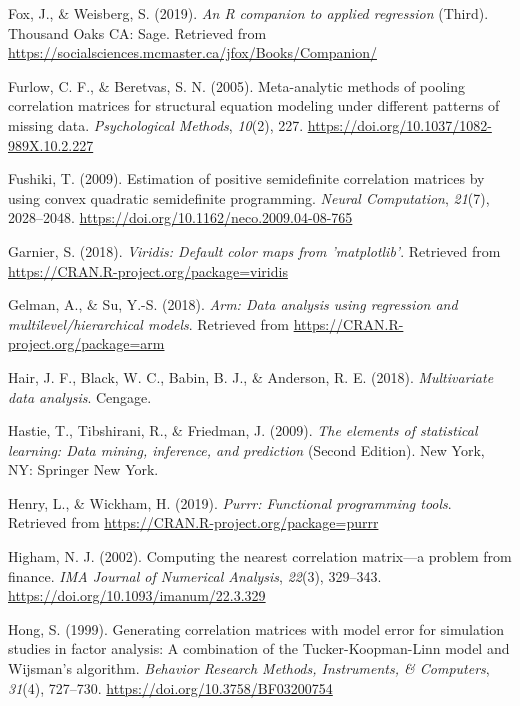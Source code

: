\documentclass[
  english,
  man]{apa6}
\begin{document}
\leavevmode\hypertarget{ref-R-car}{}%
Fox, J., \& Weisberg, S. (2019). \emph{An R companion to applied regression} (Third). Thousand Oaks CA: Sage. Retrieved from \url{https://socialsciences.mcmaster.ca/jfox/Books/Companion/}

\leavevmode\hypertarget{ref-furlow2005}{}%
Furlow, C. F., \& Beretvas, S. N. (2005). Meta-analytic methods of pooling correlation matrices for structural equation modeling under different patterns of missing data. \emph{Psychological Methods}, \emph{10}(2), 227. \url{https://doi.org/10.1037/1082-989X.10.2.227}

\leavevmode\hypertarget{ref-fushiki2009}{}%
Fushiki, T. (2009). Estimation of positive semidefinite correlation matrices by using convex quadratic semidefinite programming. \emph{Neural Computation}, \emph{21}(7), 2028--2048. \url{https://doi.org/10.1162/neco.2009.04-08-765}

\leavevmode\hypertarget{ref-R-viridis}{}%
Garnier, S. (2018). \emph{Viridis: Default color maps from 'matplotlib'}. Retrieved from \url{https://CRAN.R-project.org/package=viridis}

\leavevmode\hypertarget{ref-R-arm}{}%
Gelman, A., \& Su, Y.-S. (2018). \emph{Arm: Data analysis using regression and multilevel/hierarchical models}. Retrieved from \url{https://CRAN.R-project.org/package=arm}

\leavevmode\hypertarget{ref-hair2018}{}%
Hair, J. F., Black, W. C., Babin, B. J., \& Anderson, R. E. (2018). \emph{Multivariate data analysis}. Cengage.

\leavevmode\hypertarget{ref-hastie2009}{}%
Hastie, T., Tibshirani, R., \& Friedman, J. (2009). \emph{The elements of statistical learning: Data mining, inference, and prediction} (Second Edition). New York, NY: Springer New York.

\leavevmode\hypertarget{ref-R-purrr}{}%
Henry, L., \& Wickham, H. (2019). \emph{Purrr: Functional programming tools}. Retrieved from \url{https://CRAN.R-project.org/package=purrr}

\leavevmode\hypertarget{ref-higham2002}{}%
Higham, N. J. (2002). Computing the nearest correlation matrix---a problem from finance. \emph{IMA Journal of Numerical Analysis}, \emph{22}(3), 329--343. \url{https://doi.org/10.1093/imanum/22.3.329}

\leavevmode\hypertarget{ref-hong1999}{}%
Hong, S. (1999). Generating correlation matrices with model error for simulation studies in factor analysis: A combination of the Tucker-Koopman-Linn model and Wijsman's algorithm. \emph{Behavior Research Methods, Instruments, \& Computers}, \emph{31}(4), 727--730. \url{https://doi.org/10.3758/BF03200754}
\end{document}
